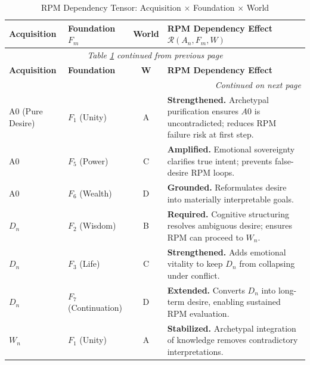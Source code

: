 \renewcommand{\arraystretch}{1.35}
\begin{longtable}{p{2cm}|p{2cm}|c|p{5.5cm}}
\caption{RPM Dependency Tensor: Acquisition $\times$ Foundation $\times$ World}
\label{tab:rpm-dependency-tensor} \\
\toprule
\textbf{Acquisition}
& \textbf{Foundation $F_m$}
& \textbf{World}
& \textbf{RPM Dependency Effect $\mathcal{R}(A_n, F_m, W)$}
\\
\midrule
\endfirsthead
\multicolumn{4}{c}{\textit{Table \ref{tab:rpm-dependency-tensor} continued from previous page}} \\
\toprule
\textbf{Acquisition}
& \textbf{Foundation}
& \textbf{W}
& \textbf{RPM Dependency Effect}
\\
\midrule
\endhead
\midrule
\multicolumn{4}{r}{\textit{Continued on next page}} \\
\endfoot
\bottomrule
\endlastfoot

A0 (Pure Desire) & $F_1$ (Unity) & A
& \textbf{Strengthened.} Archetypal purification ensures $A0$ is uncontradicted; reduces RPM failure risk at first step. \\

A0 & $F_5$ (Power) & C
& \textbf{Amplified.} Emotional sovereignty clarifies true intent; prevents false-desire RPM loops. \\

A0 & $F_6$ (Wealth) & D
& \textbf{Grounded.} Reformulates desire into materially interpretable goals. \\

\midrule

$D_n$ & $F_2$ (Wisdom) & B
& \textbf{Required.} Cognitive structuring resolves ambiguous desire; ensures RPM can proceed to $W_n$. \\

$D_n$ & $F_3$ (Life) & C
& \textbf{Strengthened.} Adds emotional vitality to keep $D_n$ from collapsing under conflict. \\

$D_n$ & $F_7$ (Continuation) & D
& \textbf{Extended.} Converts $D_n$ into long-term desire, enabling sustained RPM evaluation. \\

\midrule

$W_n$ & $F_1$ (Unity) & A
& \textbf{Stabilized.} Archetypal integration of knowledge removes contradictory interpretations. \\


\end{longtable}
